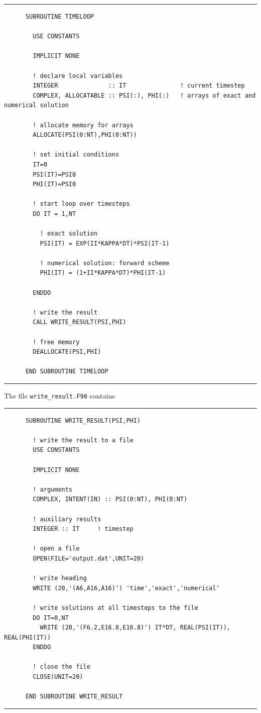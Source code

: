 \documentclass[a4paper]{article}
\begin{document}
{\vspace{10pt}\hrule\small\vspace*{-2pt}\begin{verbatim}
	  SUBROUTINE TIMELOOP

	    USE CONSTANTS

	    IMPLICIT NONE

	    ! declare local variables
	    INTEGER              :: IT               ! current timestep
	    COMPLEX, ALLOCATABLE :: PSI(:), PHI(:)   ! arrays of exact and numerical solution

	    ! allocate memory for arrays
	    ALLOCATE(PSI(0:NT),PHI(0:NT))

	    ! set initial conditions
	    IT=0
	    PSI(IT)=PSI0
	    PHI(IT)=PSI0

	    ! start loop over timesteps
	    DO IT = 1,NT

	      ! exact solution
	      PSI(IT) = EXP(II*KAPPA*DT)*PSI(IT-1)

	      ! numerical solution: forward scheme
	      PHI(IT) = (1+II*KAPPA*DT)*PHI(IT-1)

	    ENDDO
	    
	    ! write the result
	    CALL WRITE_RESULT(PSI,PHI)
		
	    ! free memory
	    DEALLOCATE(PSI,PHI)

	  END SUBROUTINE TIMELOOP
\end{verbatim}\hrule\vspace{5pt}}
%
\par
The file \verb+write_result.F90+ contains
% 
{\vspace{10pt}\hrule\small\vspace*{-2pt}\begin{verbatim}
	  SUBROUTINE WRITE_RESULT(PSI,PHI)

	    ! write the result to a file
	    USE CONSTANTS

	    IMPLICIT NONE

	    ! arguments
	    COMPLEX, INTENT(IN) :: PSI(0:NT), PHI(0:NT)
	    
	    ! auxiliary results
	    INTEGER :: IT     ! timestep

	    ! open a file
	    OPEN(FILE='output.dat',UNIT=20)
	    
	    ! write heading
	    WRITE (20,'(A6,A16,A16)') 'time','exact','numerical'
	    
	    ! write solutions at all timesteps to the file
	    DO IT=0,NT
	      WRITE (20,'(F6.2,E16.8,E16.8)') IT*DT, REAL(PSI(IT)), REAL(PHI(IT))
	    ENDDO
	    
	    ! close the file
	    CLOSE(UNIT=20)

	  END SUBROUTINE WRITE_RESULT
\end{verbatim}\hrule\vspace{5pt}}
\end{document}

